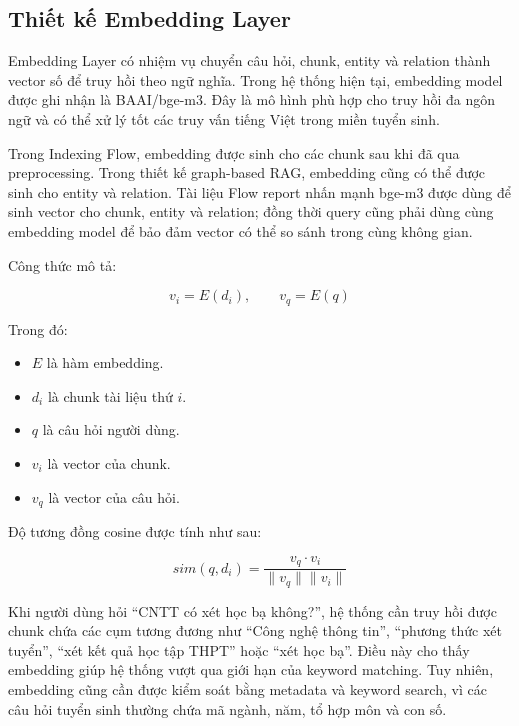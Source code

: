 \subsection{Thiết kế Embedding Layer}

Embedding Layer có nhiệm vụ chuyển câu hỏi, chunk, entity và relation thành vector số để truy hồi theo ngữ nghĩa. Trong hệ thống hiện tại, embedding model được ghi nhận là BAAI/bge-m3. Đây là mô hình phù hợp cho truy hồi đa ngôn ngữ và có thể xử lý tốt các truy vấn tiếng Việt trong miền tuyển sinh.

Trong Indexing Flow, embedding được sinh cho các chunk sau khi đã qua preprocessing. Trong thiết kế graph-based RAG, embedding cũng có thể được sinh cho entity và relation. Tài liệu Flow report nhấn mạnh bge-m3 được dùng để sinh vector cho chunk, entity và relation; đồng thời query cũng phải dùng cùng embedding model để bảo đảm vector có thể so sánh trong cùng không gian.

Công thức mô tả:

\begin{equation}
v_i = E(d_i), \qquad v_q = E(q)
\end{equation}

Trong đó:

\begin{itemize}
    \item $E$ là hàm embedding.
    \item $d_i$ là chunk tài liệu thứ $i$.
    \item $q$ là câu hỏi người dùng.
    \item $v_i$ là vector của chunk.
    \item $v_q$ là vector của câu hỏi.
\end{itemize}

Độ tương đồng cosine được tính như sau:

\begin{equation}
sim(q, d_i) = \frac{v_q \cdot v_i}{\|v_q\| \|v_i\|}
\end{equation}

Khi người dùng hỏi ``CNTT có xét học bạ không?'', hệ thống cần truy hồi được chunk chứa các cụm tương đương như ``Công nghệ thông tin'', ``phương thức xét tuyển'', ``xét kết quả học tập THPT'' hoặc ``xét học bạ''. Điều này cho thấy embedding giúp hệ thống vượt qua giới hạn của keyword matching. Tuy nhiên, embedding cũng cần được kiểm soát bằng metadata và keyword search, vì các câu hỏi tuyển sinh thường chứa mã ngành, năm, tổ hợp môn và con số.

